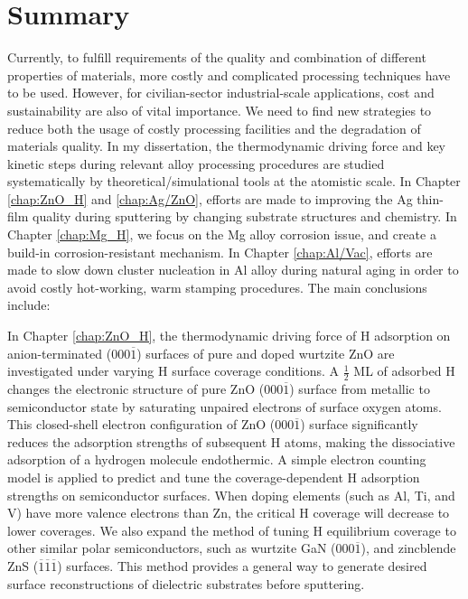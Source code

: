 \section{Summary}

Currently, to fulfill requirements of the quality and combination of different properties of materials, more costly and complicated processing techniques have to be used. However, for civilian-sector industrial-scale applications, cost and sustainability are also of vital importance. We need to find new strategies to reduce both the usage of costly processing facilities and the degradation of materials quality. In my dissertation, the thermodynamic driving force and key kinetic steps during relevant alloy processing procedures are studied systematically by theoretical/simulational tools at the atomistic scale. In Chapter \ref{chap:ZnO_H} and \ref{chap:Ag/ZnO}, efforts are made to improving the Ag thin-film quality during sputtering by changing substrate structures and chemistry. In Chapter \ref{chap:Mg_H}, we focus on the Mg alloy corrosion issue, and create a build-in corrosion-resistant mechanism. In Chapter \ref{chap:Al/Vac}, efforts are made to slow down cluster nucleation in Al alloy during natural aging in order to avoid costly hot-working, warm stamping procedures. The main conclusions include:

In Chapter \ref{chap:ZnO_H}, the thermodynamic driving force of H adsorption on anion-terminated (000$\overline{1}$) surfaces of pure and doped wurtzite ZnO are investigated under varying H surface coverage conditions. A $\frac{1}{2}$ \ac{ML} of adsorbed H changes the electronic structure of pure ZnO (000$\overline{1}$) surface from metallic to semiconductor state by saturating unpaired electrons of surface oxygen atoms. This closed-shell electron configuration of ZnO (000$\overline{1}$) surface significantly reduces the adsorption strengths of subsequent H atoms, making the dissociative adsorption of a hydrogen molecule endothermic. A simple electron counting model is applied to predict and tune the coverage-dependent H adsorption strengths on semiconductor surfaces. When doping elements (such as Al, Ti, and V) have more valence electrons than Zn, the critical H coverage will decrease to lower coverages. We also expand the method of tuning H equilibrium coverage to other similar polar semiconductors, such as wurtzite GaN (000$\overline{1}$), and zincblende ZnS ($\overline{1}$$\overline{1}$$\overline{1}$) surfaces. This method provides a general way to generate desired surface reconstructions of dielectric substrates before sputtering.

